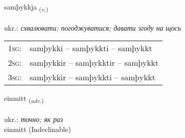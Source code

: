 \documentclass[frontgrid, backgrid]{flacards}\usepackage[]{graphicx}\usepackage[]{xcolor}
\begin{document}
\renewcommand{\flhead}{\vskip5pt \fboxsep=0pt {\small\bfseries\footnotesize Sagnorð | дієслово}}
\renewcommand{\fcfoot}{\vskip5pt \fboxsep=0pt \hspace{2pt}{\small\bfseries\footnotesize 1K}}

\renewcommand{\blhead}{\vskip5pt {\small\bfseries\footnotesize Sagnorð | дієслово }}
\renewcommand{\bcfoot}{\vskip5pt \hspace{2pt}{\small\bfseries\footnotesize 1K}}


{samþykkja \small{\textsubscript{(\textit{v.})}} \\[1ex] %
\textphonetic{[samθɪhca]} \\
ukr.: \emph{схвалювати; погоджуватися; давати згоду на щось} \\  [2ex]
\renewcommand*{\arraystretch}{0.8}
\begin{tabular}{p{1cm}l}
\textsc{1sg}: & samþykki -- samþykkti -- samþykkt \\ 
\textsc{2sg}: & samþykkir -- samþykktir -- samþykkt \\ 
\textsc{3sg}: & samþykkir -- samþykkti -- samþykkt \\ 
\end{tabular}
}


\renewcommand{\flhead}{\vskip5pt \fboxsep=0pt {\small\bfseries\footnotesize Atviksorð | прислівник}}
\renewcommand{\fcfoot}{\vskip5pt \fboxsep=0pt \hspace{2pt}{\small\bfseries\footnotesize 1K}}

\renewcommand{\blhead}{\vskip5pt {\small\bfseries\footnotesize Atviksorð | прислівник }}
\renewcommand{\bcfoot}{\vskip5pt \hspace{2pt}{\small\bfseries\footnotesize 1K}}


{einmitt \small{\textsubscript{(\textit{adv.})}} \\[1ex]
\textphonetic{[einmɪht]} \\
ukr.: \emph{точно; як раз} \\  [2ex]
einmitt (Indeclinable)}
\end{document}
